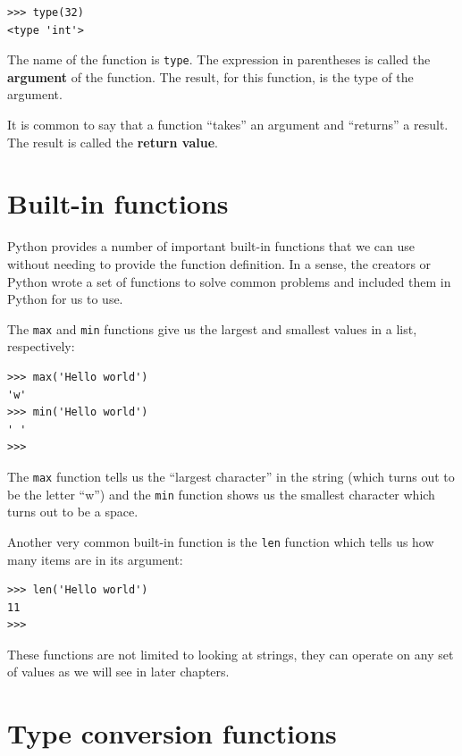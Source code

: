 \documentclass[10pt]{book}
\begin{document}
\beforeverb
\begin{verbatim}
>>> type(32)
<type 'int'>
\end{verbatim}
\afterverb
%
The name of the function is {\tt type}.  The expression in parentheses
is called the {\bf argument} of the function.  The result, for this
function, is the type of the argument.


It is common to say that a function ``takes'' an argument and ``returns''
a result.  The result is called the {\bf return value}.


\section{Built-in functions}

Python provides a number of important built-in functions that
we can use without needing to provide the function definition.
In a sense, the creators or Python wrote a set of functions 
to solve common problems and included them in Python for us to use.

The {\tt max} and {\tt min} functions give us the largest and 
smallest values in a list, respectively:

\beforeverb
\begin{verbatim}
>>> max('Hello world')
'w'
>>> min('Hello world')
' '
>>>
\end{verbatim}
\afterverb
%
The {\tt max} function tells us the ``largest character'' in the 
string (which turns out to be the letter ``w'') and the {\tt min}
function shows us the smallest character which turns out to be a 
space.

Another very common built-in function is the {\tt len} function
which tells us how many items are in its argument:

\beforeverb
\begin{verbatim}
>>> len('Hello world')
11
>>>
\end{verbatim}
\afterverb
%
These functions are not limited to looking at strings, they can operate
on any set of values as we will see in later chapters.

\section{Type conversion functions}

\end{document}
